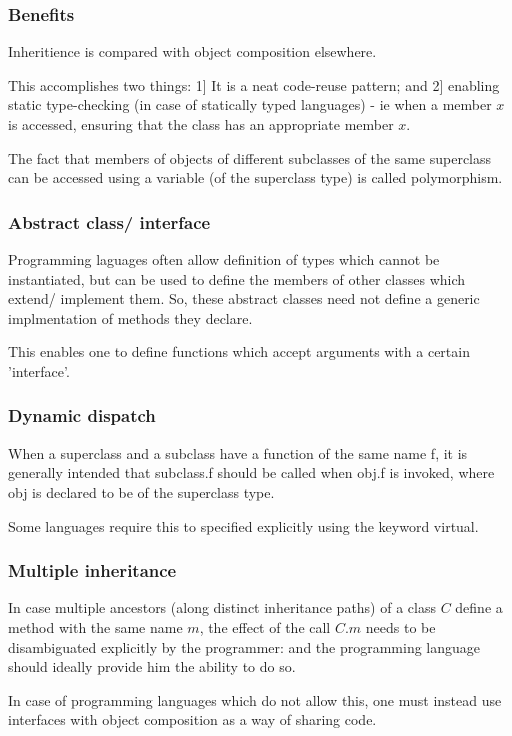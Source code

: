 \documentclass[oneside, article]{memoir}
\begin{document}
\subsubsection{Benefits}
Inheritience is compared with object composition elsewhere.

This accomplishes two things: 1] It is a neat code-reuse pattern; and 2] enabling static type-checking (in case of statically typed languages) - ie when a member $x$ is accessed, ensuring that the class has an appropriate member $x$.

The fact that members of objects of different subclasses of the same superclass can be accessed using a variable (of the superclass type) is called polymorphism.

\subsubsection{Abstract class/ interface}
Programming laguages often allow definition of types which cannot be instantiated, but can be used to define the members of other classes which extend/ implement them. So, these abstract classes need not define a generic implmentation of methods they declare.

This enables one to define functions which accept arguments with a certain 'interface'.

\subsubsection{Dynamic dispatch}
When a superclass and a subclass have a function of the same name f, it is generally intended that subclass.f should be called when obj.f is invoked, where obj is declared to be of the superclass type.

Some languages require this to specified explicitly using the keyword virtual.

\subsubsection{Multiple inheritance}
In case multiple ancestors (along distinct inheritance paths) of a class $C$ define a method with the same name $m$, the effect of the call $C.m$ needs to be disambiguated explicitly by the programmer: and the programming language should ideally provide him the ability to do so.

In case of programming languages which do not allow this, one must instead use interfaces with object composition as a way of sharing code.
\end{document}
